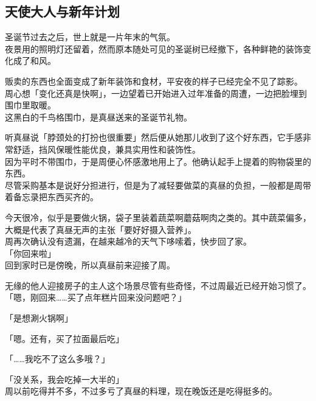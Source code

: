 \subsection{天使大人与新年计划}

圣诞节过去之后，世上就是一片年末的气氛。\\

夜景用的照明灯还留着，然而原本随处可见的圣诞树已经撤下，各种鲜艳的装饰变化成了和风。

贩卖的东西也全面变成了新年装饰和食材，平安夜的样子已经完全不见了踪影。\\

周心想「变化还真是快啊」，一边望着已开始进入过年准备的周遭，一边把脸埋到围巾里取暖。\\

这黑白的千鸟格围巾，是真昼送来的圣诞节礼物。

听真昼说「脖颈处的打扮也很重要」然后便从她那儿收到了这个好东西，它手感非常舒适，挡风保暖性能优良，兼具实用性和装饰性。\\

因为平时不带围巾，于是周便心怀感激地用上了。他确认起手上提着的购物袋里的东西。\\

尽管采购基本是说好分担进行，但是为了减轻要做菜的真昼的负担，一般都是周带着备忘录把东西买齐的。

今天很冷，似乎是要做火锅，袋子里装着蔬菜啊蘑菇啊肉之类的。其中蔬菜偏多，大概是代表了真昼无声的主张「要好好摄入营养」。\\

周再次确认没有遗漏，在越来越冷的天气下哆嗦着，快步回了家。\\

「你回来啦」\\

回到家时已是傍晚，所以真昼前来迎接了周。

无缘的他人迎接房子的主人这个场景尽管有些奇怪，不过周最近已经开始习惯了。\\

「嗯，刚回来……买了点年糕片回来没问题吧？」

「是想涮火锅啊」

「嗯。还有，买了拉面最后吃」

「……我吃不了这么多哦？」

「没关系，我会吃掉一大半的」\\

周以前吃得并不多，不过多亏了真昼的料理，现在晚饭还是吃得挺多的。\\

